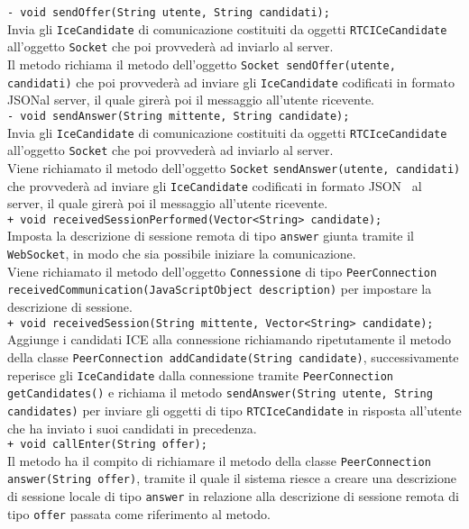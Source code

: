 {{\begin{sloppypar}
{{{\begin{itemize}
{					\texttt{- void sendOffer(String utente, String candidati);}\\
					Invia gli \texttt{IceCandidate} di comunicazione costituiti da oggetti \texttt{RTCICeCandidate} all'oggetto \texttt{Socket} che poi provvederà ad inviarlo al server\g.\\
					Il metodo richiama il metodo dell'oggetto \texttt{Socket sendOffer(utente, candidati)} che poi provvederà ad inviare gli \texttt{IceCandidate} codificati in formato JSON\g al server\g, il quale girerà poi il messaggio all'utente ricevente.\\

					\texttt{- void sendAnswer(String mittente, String candidate);}\\
					Invia gli \texttt{IceCandidate} di comunicazione costituiti da oggetti \texttt{RTCIceCandidate} all'oggetto \texttt{Socket} che poi provvederà ad inviarlo al server\g.\\
					Viene richiamato il metodo dell'oggetto \texttt{Socket} \texttt{sendAnswer(utente, candidati)} che provvederà ad inviare gli \texttt{IceCandidate} codificati in formato JSON\g~ al server\g, il quale girerà poi il messaggio all'utente ricevente.\\

					\texttt{+ void receivedSessionPerformed(Vector<String> candidate);}\\
					Imposta la descrizione di sessione remota di tipo \texttt{answer} giunta tramite il \texttt{WebSocket}, in modo che sia possibile iniziare la comunicazione.\\
					Viene richiamato il metodo dell'oggetto \texttt{Connessione} di tipo \texttt{PeerConnection receivedCommunication(JavaScriptObject description)} per impostare la descrizione di sessione.\\

					\texttt{+ void receivedSession(String mittente, Vector<String> candidate);}\\
					Aggiunge i candidati ICE alla connessione richiamando ripetutamente il metodo della classe \texttt{PeerConnection addCandidate(String candidate)}, successivamente reperisce gli \texttt{IceCandidate} dalla connessione tramite \texttt{PeerConnection getCandidates()} e richiama il metodo \texttt{sendAnswer(String utente, String candidates)} per inviare gli oggetti di tipo \texttt{RTCIceCandidate} in risposta all'utente che ha inviato i suoi candidati in precedenza.\\
	
					\texttt{+ void callEnter(String offer);}\\
					Il metodo ha il compito di richiamare il metodo della classe \texttt{PeerConnection} \texttt{answer(String offer)}, tramite il quale il sistema riesce a creare una descrizione di sessione locale di tipo \texttt{answer} in relazione alla descrizione di sessione remota di tipo \texttt{offer} passata come riferimento al metodo.\\
					
}
\end{itemize}}}}
\end{sloppypar}}}
